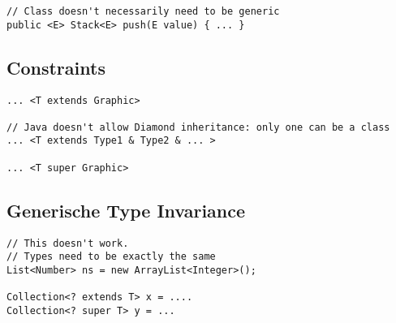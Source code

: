 \begin{multicols*}{4}
\begin{lstlisting}
// Class doesn't necessarily need to be generic
public <E> Stack<E> push(E value) { ... }
	\end{lstlisting}

	\subsection{Constraints}
		\begin{lstlisting}
... <T extends Graphic>

// Java doesn't allow Diamond inheritance: only one can be a class
... <T extends Type1 & Type2 & ... >

... <T super Graphic>
		\end{lstlisting}
	
	\subsection{Generische Type Invariance}
		\begin{lstlisting}
// This doesn't work. 
// Types need to be exactly the same
List<Number> ns = new ArrayList<Integer>();

Collection<? extends T> x = ....
Collection<? super T> y = ...
		\end{lstlisting}


\end{multicols*}

% 

